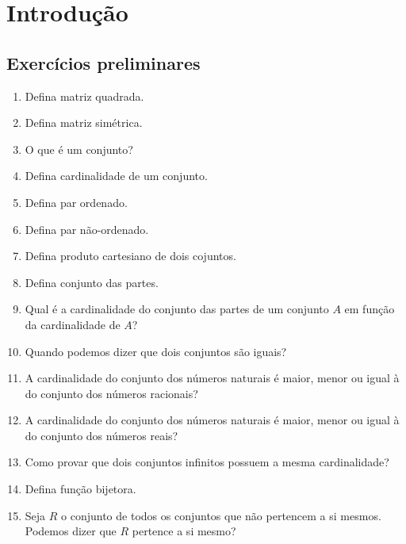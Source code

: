 \chapter{Introdução}


\setcounter{page}{1}    %



\section{Exercícios preliminares}

\begin{enumerate}
\item Defina matriz quadrada.
\item Defina matriz simétrica.
\item O que é um conjunto?
\item Defina cardinalidade de um conjunto.
\item Defina par ordenado.
\item Defina par não-ordenado.
\item Defina produto cartesiano de dois cojuntos.
\item Defina conjunto das partes.
\item Qual é a cardinalidade do conjunto das partes de um conjunto $A$ em função da cardinalidade de $A$?
\item Quando podemos dizer que dois conjuntos são iguais?
\item A cardinalidade do conjunto dos números naturais é maior, menor ou igual à do conjunto dos números racionais?
\item A cardinalidade do conjunto dos números naturais é maior, menor ou igual à do conjunto dos números reais?
\item Como provar que dois conjuntos infinitos possuem a mesma cardinalidade?
\item Defina função bijetora.
\item Seja $R$ o conjunto de todos os conjuntos que não pertencem a si mesmos. Podemos dizer que $R$ pertence a si mesmo?
\end{enumerate}

\begin{easylist}

\end{easylist}
